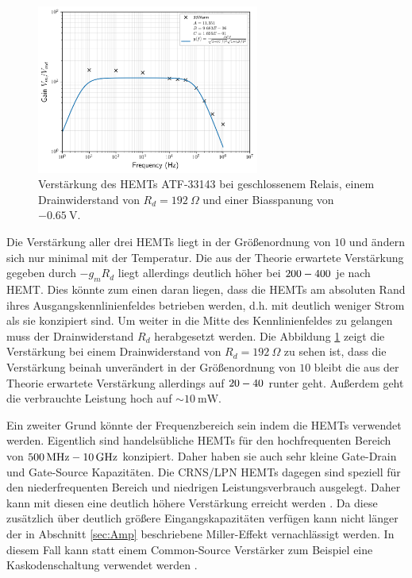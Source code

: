 \begin{figure}[!b]
\begin{center}
\includegraphics[width=0.65\textwidth]{./fig/Gain/G33WarmMarch21.png}
\vspace{-0.5cm}
\caption{Verstärkung des HEMTs ATF-33143 bei geschlossenem Relais, einem Drainwiderstand von $R_d = \SI{192}{\Omega}$ und einer Biasspanung von $\SI{-0.65}{\volt}$.}
\label{fig:33WarmGain100}
\end{center}
\end{figure}

Die Verstärkung aller drei HEMTs liegt in der Größenordnung von $10$ und ändern sich nur minimal mit der Temperatur.
Die aus der Theorie erwartete Verstärkung gegeben durch $-g_m R_d$ liegt allerdings deutlich höher bei $200\-- 400$ je nach HEMT.
Dies könnte zum einen daran liegen, dass die HEMTs am absoluten Rand ihres Ausgangskennlinienfeldes betrieben werden, d.h. mit deutlich weniger Strom als sie konzipiert sind.
Um weiter in die Mitte des Kennlinienfeldes zu gelangen muss der Drainwiderstand $R_d$ herabgesetzt werden.
Die Abbildung \ref{fig:33WarmGain100} zeigt die Verstärkung bei einem Drainwiderstand von $R_d=\SI{192}{\Omega}$ zu sehen ist, dass die Verstärkung beinah unverändert in der Größenordnung von $10$ bleibt die aus der Theorie erwartete Verstärkung allerdings auf $20 \-- 40$ runter geht.
Außerdem geht die verbrauchte Leistung hoch auf $\sim\SI{10}{\milli\watt}$.

Ein zweiter Grund könnte der Frequenzbereich sein indem die HEMTs verwendet werden.
Eigentlich sind handelsübliche HEMTs für den hochfrequenten Bereich von $\SI{500}{\mega\hertz}\--\SI{10}{\giga\hertz}$ konzipiert.
Daher haben sie auch sehr kleine Gate-Drain und Gate-Source Kapazitäten.
Die CRNS/LPN HEMTs dagegen sind speziell für den niederfrequenten Bereich und niedrigen Leistungsverbrauch ausgelegt.
Daher kann mit diesen eine deutlich höhere Verstärkung erreicht werden \cite{Phipps:2016mwv}.
Da diese zusätzlich über deutlich größere Eingangskapazitäten verfügen kann nicht länger der in Abschnitt \ref{sec:Amp} beschriebene Miller-Effekt vernachlässigt werden.
In diesem Fall kann statt einem Common-Source Verstärker zum Beispiel eine Kaskodenschaltung verwendet werden \cite{Gray}.

